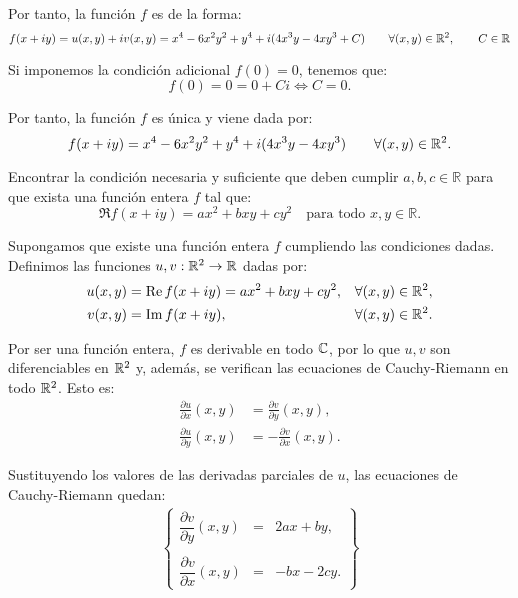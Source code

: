 \begin{ejercicio}
    Por tanto, la función $f$ es de la forma:
    \[
        f(x+iy) = u(x,y) + iv(x,y) = x^4 - 6x^2y^2 + y^4 + i(4x^3y -4xy^3 + C)\qquad \forall (x,y)\in\mathbb{R}^2,\qquad C\in \mathbb{R}
    \]

    Si imponemos la condición adicional $f(0)=0$, tenemos que:
    \[
        f(0) = 0 = 0+ Ci \iff C=0.
    \]

    Por tanto, la función $f$ es única y viene dada por:
    \[
        f(x+iy) = x^4 - 6x^2y^2 + y^4 + i(4x^3y -4xy^3)\qquad \forall (x,y)\in\mathbb{R}^2.
    \]
\end{ejercicio}

\begin{ejercicio}
    Encontrar la condición necesaria y suficiente que deben cumplir $a, b, c \in \mathbb{R}$ para que exista una función entera $f$ tal que:
    \[
        \Re f(x + iy) = ax^2 + bxy + cy^2 \quad \text{para todo } x, y \in \mathbb{R}.
    \]

    Supongamos que existe una función entera $f$ cumpliendo las condiciones dadas.
    Definimos las funciones $u,v:\mathbb{R}^2\to\mathbb{R}$ dadas por:
    \begin{align*}
        u(x,y) &= \operatorname{Re} f(x+iy) = ax^2 + bxy + cy^2,&\forall (x,y)\in\mathbb{R}^2,\\
        v(x,y) &= \operatorname{Im} f(x+iy),&\forall (x,y)\in\mathbb{R}^2.
    \end{align*}

    Por ser una función entera, $f$ es derivable en todo $\mathbb{C}$, por lo que $u,v$ son diferenciables en $\mathbb{R}^2$ y, además, se verifican las ecuaciones de Cauchy-Riemann en todo $\mathbb{R}^2$. Esto es:
    \begin{align*}
        \frac{\partial u}{\partial x}(x,y) &= \frac{\partial v}{\partial y}(x,y),\\
        \frac{\partial u}{\partial y}(x,y) &= -\frac{\partial v}{\partial x}(x,y).
    \end{align*}
    
    Sustituyendo los valores de las derivadas parciales de $u$, las ecuaciones de Cauchy-Riemann quedan:
    \begin{align*}
        \left\{
            \begin{array}{rcl}
                \dfrac{\partial v}{\partial y}(x,y) &=& 2ax + by,\\ \\
                \dfrac{\partial v}{\partial x}(x,y) &=& -bx - 2cy.
            \end{array}
        \right\}
    \end{align*}


\end{ejercicio}
